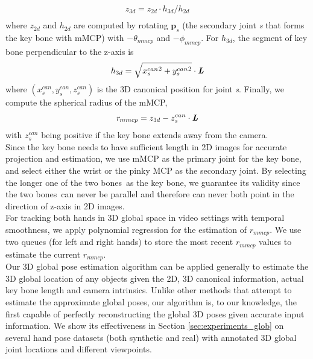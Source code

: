 \documentclass[10pt,twocolumn,letterpaper]{article}
\begin{document}
\begin{equation}\label{eq:spherical_radius1}
\begin{gathered}
z_{3d} = z_{2d} \cdot h_{3d} / h_{2d}\\
\end{gathered}
\end{equation}
where $z_{2d}$ and $h_{2d}$ are computed by rotating $\textbf{p}_{s}$ (the secondary joint \textit{s} that forms the key bone with mMCP) with $-\theta_{mmcp}$ and $-\phi_{mmcp}$. For $h_{3d}$, the segment of key bone perpendicular to the z-axis is\\
\begin{equation}\label{eq:spherical_radius2}
\begin{gathered}
h_{3d} = \sqrt{{x^{can}_{s}}^2 + {y^{can}_{s}}^2}\cdot\textbf{\textit{L}}\\
\end{gathered}
\end{equation}
where $(x_{s}^{can}, y_{s}^{can}, z_{s}^{can})$ is the 3D canonical position for joint \textit{s}. Finally, we compute the spherical radius of the mMCP, \\
\begin{equation}\label{eq:spherical_radius3}
\begin{gathered}
\textit{r}_{mmcp} = z_{3d} - z_{s}^{can} \cdot \textbf{\textit{L}}\\
\end{gathered}
\end{equation}
with $z_{s}^{can}$ being positive if the key bone extends away from the camera.\\
\indent Since the key bone needs to have sufficient length in 2D images for accurate projection and estimation, we use mMCP as the primary joint for the key bone, and select either the wrist or the pinky MCP as the secondary joint. By selecting the longer one of the two \textquotedbl bones\textquotedbl\ as the key bone, we guarantee its validity since the two \textquotedbl bones\textquotedbl\ can never be parallel and therefore can never both point in the direction of z-axis in 2D images.\\
\indent For tracking both hands in 3D global space in video settings with temporal smoothness, we apply polynomial regression for the estimation of $\textit{r}_{mmcp}$. We use two queues (for left and right hands) to store the most recent $\textit{r}_{mmcp}$ values to estimate the current $\textit{r}_{mmcp}$.\\
\indent Our 3D global pose estimation algorithm can be applied generally to estimate the 3D global location of any objects given the 2D, 3D canonical information, actual key bone length and camera intrinsics. Unlike other methods \cite{Moon,Rogez} that attempt to estimate the approximate global poses, our algorithm is, to our knowledge, the first capable of perfectly reconstructing the global 3D poses given accurate input information. We show its effectiveness in Section \ref{sec:experiments_glob} on several hand pose datasets (both synthetic and real) with annotated 3D global joint locations and different viewpoints.
\end{document}
